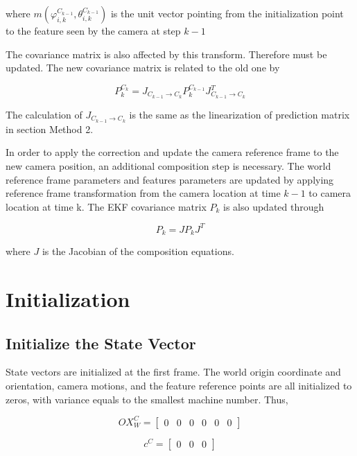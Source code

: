 \noindent where $m(\varphi_{i, k}^{C_{k-1}}, \theta_{i, k}^{C_{k-1}})$ is the 
unit vector pointing from the initialization point to the feature seen 
by the camera at step $k-1$

The covariance matrix is also affected by this transform. Therefore must 
be updated. The new covariance matrix is related to the old one by 

\begin{equation}
P_{k}^{C_{k}}=J_{C_{k-1}\to C_{k}}P_{k}^{C_{k-1}}J_{C_{k-1}\to C_{k}}^{T}
\end{equation}

The calculation of $J_{C_{k-1}\to C_{k}}$ is the same as the 
linearization of prediction matrix in section Method 2.

In order to apply the correction and update the camera reference frame
to the new camera position, an additional composition step is
necessary. The world reference frame parameters and features
parameters are updated by applying reference frame transformation from
the camera location at time $k-1$ to camera location at time k. The
EKF covariance matrix $P_{k}$ is also updated through

\begin{equation}
P_{k}=JP_{k}J^{T}
\end{equation}

\noindent where $J$ is the Jacobian of the composition equations. 
\section{Initialization}
\subsection{Initialize the State Vector}

State vectors are initialized at the first frame. The world origin 
coordinate and orientation, camera motions, and the feature reference 
points are all initialized to zeros, with variance equals to the 
smallest machine number. Thus, 

\begin{equation}
OX_{W}^{C}=\begin{bmatrix}0&0&0&0&0&0\end{bmatrix} 
\end{equation}

\begin{equation}
c^{C}=\begin{bmatrix}0&0&0\end{bmatrix}
\end{equation}

